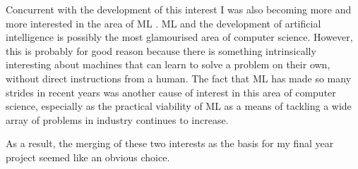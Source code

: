 Concurrent with the development of this interest I was also becoming more and more interested in the area
of ML .
ML and the development of artificial intelligence is possibly the most glamourised area
of computer science.
However, this is probably for good reason because there is something intrinsically interesting
about machines that can learn to solve a problem on their own, without direct instructions from a human.
The fact that ML has made so many strides in recent years was another cause of interest in
this area of computer science, especially as the practical viability of ML as a means of tackling a wide array
of problems in industry continues to increase.

As a result, the merging of these two interests as the basis for my final year project seemed like an obvious choice.